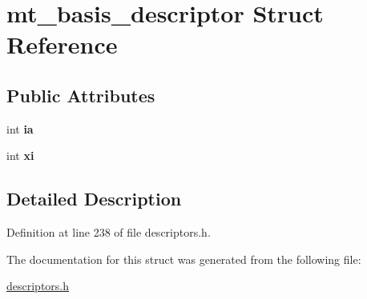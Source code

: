 \hypertarget{structmt__basis__descriptor}{}\section{mt\+\_\+basis\+\_\+descriptor Struct Reference}
\label{structmt__basis__descriptor}
\subsection*{Public Attributes}
\begin{DoxyCompactItemize}
\item 
\hypertarget{structmt__basis__descriptor_af0bd3ef25f26bc3d0bd49186b7a96c50}{}int {\bfseries ia}\label{structmt__basis__descriptor_af0bd3ef25f26bc3d0bd49186b7a96c50}

\item 
\hypertarget{structmt__basis__descriptor_abd41c4679d5913bf7978d9dbb3190ddf}{}int {\bfseries xi}\label{structmt__basis__descriptor_abd41c4679d5913bf7978d9dbb3190ddf}

\end{DoxyCompactItemize}


\subsection{Detailed Description}


Definition at line 238 of file descriptors.\+h.



The documentation for this struct was generated from the following file\+:\begin{DoxyCompactItemize}
\item 
\hyperlink{descriptors_8h}{descriptors.\+h}\end{DoxyCompactItemize}

